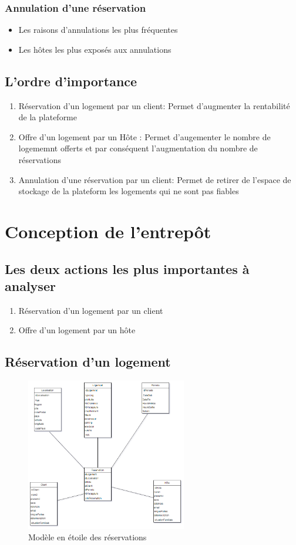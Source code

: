 \documentclass[11pt]{article}
\begin{document}
\subsubsection*{Annulation d'une réservation}
\begin{itemize}
	\item Les raisons d'annulations les plus fréquentes
	\item Les hôtes les plus exposés aux annulations
\end{itemize}
\subsection{L'ordre d'importance}
\begin{enumerate}
	\item Réservation d'un logement par un client: Permet d'augmenter la rentabilité de la plateforme
	\item Offre d'un logement par un Hôte : Permet d'augementer le nombre de logememnt offerts et par conséquent l'augmentation du nombre de réservations
	\item Annulation d'une réservation par un client: Permet de retirer de l'espace de stockage de la plateform les logements qui ne sont pas fiables
\end{enumerate}
\section{Conception de l'entrepôt}
\subsection{Les deux actions les plus importantes à analyser}
\begin{enumerate}
	\item Réservation d'un logement par un client
	\item Offre d'un logement par un hôte
\end{enumerate}
\subsection{Réservation d'un logement}
\begin{figure}[h]
	\centering
	\includegraphics*[width=7cm]{img/reservation.png}
	\caption{Modèle en étoile des réservations}
\end{figure}
\end{document}
